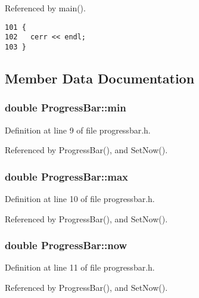 Referenced by main().

\begin{Code}\begin{verbatim}101 {
102   cerr << endl;
103 }
\end{verbatim}
\end{Code}




\subsection{Member Data Documentation}
\subsubsection{\setlength{\rightskip}{0pt plus 5cm}double {\bf ProgressBar::min}\hspace{0.3cm}{\tt  [private]}}\label{classProgressBar_044f47136c34c520d647c99d2b25c7c7}




Definition at line 9 of file progressbar.h.

Referenced by ProgressBar(), and SetNow().
\subsubsection{\setlength{\rightskip}{0pt plus 5cm}double {\bf ProgressBar::max}\hspace{0.3cm}{\tt  [private]}}\label{classProgressBar_fd056430958e4ae958e3c064180ff208}




Definition at line 10 of file progressbar.h.

Referenced by ProgressBar(), and SetNow().
\subsubsection{\setlength{\rightskip}{0pt plus 5cm}double {\bf ProgressBar::now}\hspace{0.3cm}{\tt  [private]}}\label{classProgressBar_176dbe3f61d798da0f9971f0f45db2bf}




Definition at line 11 of file progressbar.h.

Referenced by ProgressBar(), and SetNow().
